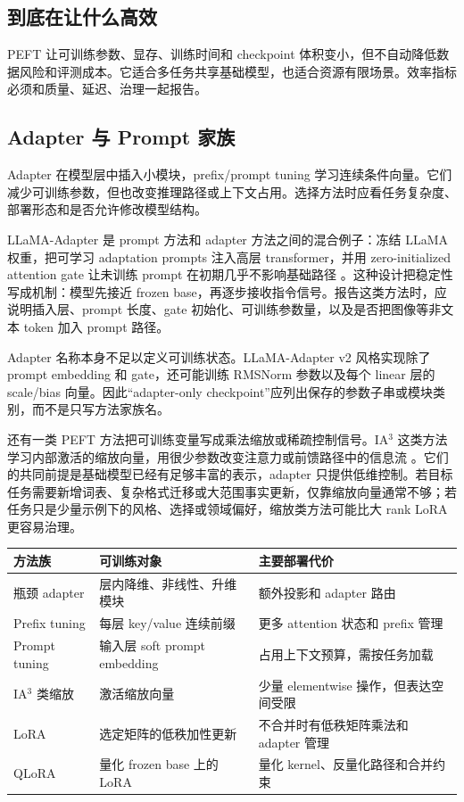 \documentclass[UTF8,zihao=-4,openany]{ctexbook}
\begin{document}
\subsection{到底在让什么高效}
PEFT 让可训练参数、显存、训练时间和 checkpoint 体积变小，但不自动降低数据风险和评测成本。它适合多任务共享基础模型，也适合资源有限场景。效率指标必须和质量、延迟、治理一起报告。

\subsection{Adapter 与 Prompt 家族}
Adapter 在模型层中插入小模块，prefix/prompt tuning 学习连续条件向量。它们减少可训练参数，但也改变推理路径或上下文占用。选择方法时应看任务复杂度、部署形态和是否允许修改模型结构。

LLaMA-Adapter 是 prompt 方法和 adapter 方法之间的混合例子：冻结 LLaMA 权重，把可学习 adaptation prompts 注入高层 transformer，并用 zero-initialized attention gate 让未训练 prompt 在初期几乎不影响基础路径 \cite{zhang2023llamaadapter}。这种设计把稳定性写成机制：模型先接近 frozen base，再逐步接收指令信号。报告这类方法时，应说明插入层、prompt 长度、gate 初始化、可训练参数量，以及是否把图像等非文本 token 加入 prompt 路径。

Adapter 名称本身不足以定义可训练状态。LLaMA-Adapter v2 风格实现除了 prompt embedding 和 gate，还可能训练 RMSNorm 参数以及每个 linear 层的 scale/bias 向量。因此“adapter-only checkpoint”应列出保存的参数子串或模块类别，而不是只写方法家族名。

还有一类 PEFT 方法把可训练变量写成乘法缩放或稀疏控制信号。IA$^3$ 这类方法学习内部激活的缩放向量，用很少参数改变注意力或前馈路径中的信息流 \cite{liu2022fewshot}。它们的共同前提是基础模型已经有足够丰富的表示，adapter 只提供低维控制。若目标任务需要新增词表、复杂格式迁移或大范围事实更新，仅靠缩放向量通常不够；若任务只是少量示例下的风格、选择或领域偏好，缩放类方法可能比大 rank LoRA 更容易治理。

\begin{center}
\begin{tabular}{p{}p{}p{}}
\toprule
方法族 & 可训练对象 & 主要部署代价 \\
\midrule
瓶颈 adapter & 层内降维、非线性、升维模块 & 额外投影和 adapter 路由 \\
Prefix tuning & 每层 key/value 连续前缀 & 更多 attention 状态和 prefix 管理 \\
Prompt tuning & 输入层 soft prompt embedding & 占用上下文预算，需按任务加载 \\
IA$^3$ 类缩放 & 激活缩放向量 & 少量 elementwise 操作，但表达空间受限 \\
LoRA & 选定矩阵的低秩加性更新 & 不合并时有低秩矩阵乘法和 adapter 管理 \\
QLoRA & 量化 frozen base 上的 LoRA & 量化 kernel、反量化路径和合并约束 \\
\bottomrule
\end{tabular}
\end{center}
\end{document}
